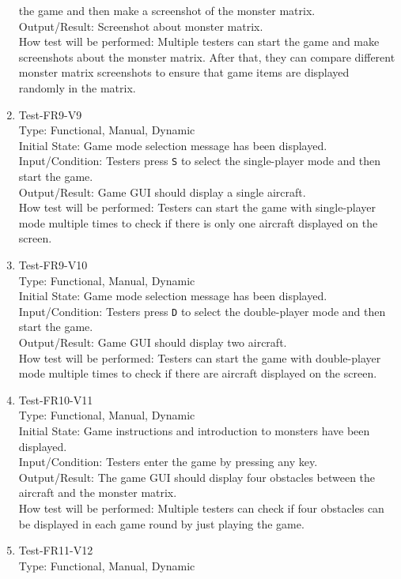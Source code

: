 \documentclass[12pt]{article}
\begin{document}
\begin{enumerate}[1.]
the game and then make a screenshot of the monster
matrix.\\
Output/Result: Screenshot about monster matrix.\\
How test will be performed: Multiple testers can start
the game and make screenshots about the monster matrix.
After that, they can compare different monster matrix
screenshots to ensure that game items are displayed 
randomly in the matrix.
\item Test-FR9-V9\\
Type: Functional, Manual, Dynamic\\
Initial State: Game mode selection message has been
displayed.\\
Input/Condition: Testers press \verb|S| to select the
single-player mode and then start the game.\\
Output/Result: Game GUI should display a single aircraft.\\
How test will be performed: Testers can start the game 
with single-player mode multiple times to check if there
is only one aircraft displayed on the screen.
\newpage
\item Test-FR9-V10\\
Type: Functional, Manual, Dynamic\\
Initial State: Game mode selection message has been
displayed.\\
Input/Condition: Testers press \verb|D| to select the
double-player mode and then start the game.\\
Output/Result: Game GUI should display two aircraft.\\
How test will be performed: Testers can start the game 
with double-player mode multiple times to check if there
are aircraft displayed on the screen.
\item Test-FR10-V11\\
Type: Functional, Manual, Dynamic\\
Initial State: Game instructions and introduction to 
monsters have been displayed.\\
Input/Condition: Testers enter the game by pressing any
key.\\
Output/Result: The game GUI should display four obstacles
between the aircraft and the monster matrix.\\
How test will be performed: Multiple testers can check
if four obstacles can be displayed in each game round 
by just playing the game.
\item Test-FR11-V12\\
Type: Functional, Manual, Dynamic\\

\end{enumerate}
\end{document}
